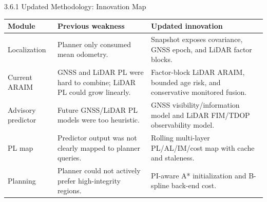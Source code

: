 \documentclass[10pt,aspectratio=169,xcolor=dvipsnames]{beamer}
\begin{document}
\begin{frame}{3.6.1 Updated Methodology: Innovation Map}
  \small
  \begin{table}\scriptsize
    \begin{tabular}{p{} p{} p{}}
      \toprule
      \textbf{Module} & \textbf{Previous weakness} & \textbf{Updated innovation}\\
      \midrule
      Localization & Planner only consumed mean odometry. & Snapshot exposes covariance, GNSS epoch, and LiDAR factor blocks.\\
      Current ARAIM & GNSS and LiDAR PL were hard to combine; LiDAR PL could grow linearly. & Factor-block LiDAR ARAIM, bounded age risk, and conservative monitored fusion.\\
      Advisory predictor & Future GNSS/LiDAR PL models were too heuristic. & GNSS visibility/information model and LiDAR FIM/TDOP observability model.\\
      PL map & Predictor output was not clearly mapped to planner queries. & Rolling multi-layer PL/AL/IM/cost map with cache and staleness.\\
      Planning & Planner could not actively prefer high-integrity regions. & PI-aware A* initialization and B-spline back-end cost.\\
      \bottomrule
    \end{tabular}
  \end{table}
\end{frame}

\end{document}
